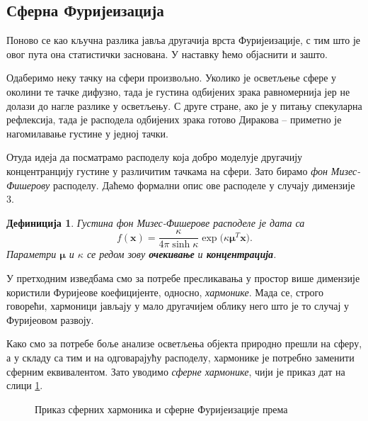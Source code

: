 \documentclass[12pt, a4paper, twoside]{book}
\numberwithin{equation}{chapter}
\numberwithin{theorem}{section}
\newtheorem{definition}{Дефиниција}
\numberwithin{definition}{section}
\numberwithin{definitionChapter}{chapter}
\begin{document}
\subsection{Сферна Фуријеизација}
Поново се као кључна разлика јавља другачија врста Фуријеизације, с тим што је овог пута она статистички
заснована. У наставку ћемо објаснити и зашто.

Одаберимо неку тачку на сфери произвољно. Уколико је осветљење сфере у околини те тачке дифузно, тада је
густина одбијених зрака равномернија јер не долази до нагле разлике у осветљењу. С друге стране,
ако је у питању спекуларна рефлексија, тада је расподела одбијених зрака готово Диракова -- приметно
је нагомилавање густине у једној тачки.

Отуда идеја да посматрамо расподелу која добро моделује другачију концентранцију густине у различитим
тачкама на сфери. Зато бирамо \textit{фон Мизес-Фишерову} расподелу. Даћемо формални опис ове
расподеле у случају димензије 3.

	\begin{definition}
		Густина фон Мизес-Фишерове расподеле је дата са
		$$f(\textbf{x}) = \frac{\kappa}{4\pi \sinh\kappa} \exp(\kappa\boldsymbol{\mu}^T\textbf{x)}.$$
		Параметри $\boldsymbol{\mu}$ и $\kappa$ се редом зову \textbf{очекивање} и \textbf{концентрација}.
	\end{definition}

У претходним изведбама смо за потребе пресликавања у простор  више димензије користили Фуријеове коефицијенте,
односно, \textit{хармонике}. Мада се, строго говорећи, хармоници јављају у мало другачијем облику него што је то
случај у Фуријеовом развоју.

Како смо за потребе боље анализе осветљења објекта природно прешли на сферу, а у складу са тим и на одговарајућу
расподелу, хармонике је потребно заменити сферним еквивалентом. Зато уводимо \textit{сферне хармонике}, чији
је приказ дат на слици \ref{fig-refnerf-ide}.

\begin{figure}[H]
	\begin{center}
	\end{center}
	\caption{Приказ сферних хармоника и сферне Фуријеизације према \cite{ref-nerf}}
	\label{fig-refnerf-ide}
\end{figure}
\end{document}
